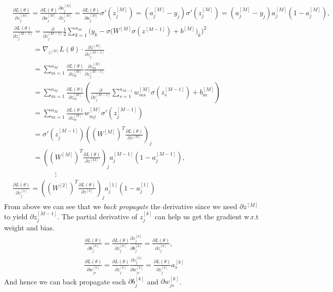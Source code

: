 \documentclass{article}
\begin{document}
            \begin{align*}
                & \frac{\partial L(\theta)}{\partial z_j^{[M]}} = \frac{\partial L(\theta)}{\partial a_j^{[M]}}\frac{\partial a_j^{[M]}}{\partial z_j^{[M]}}=\frac{\partial L(\theta)}{\partial a_j^{[M]}}\sigma'(z_j^{[M]})=(a_j^{[M]}-y_j)\sigma'(z_j^{[M]})=(a_j^{[M]}-y_j)a_j^{[M]}(1-a_j^{[M]}), \\
                & \frac{\partial L(\theta)}{\partial z_j^{[M-1]}} = \frac{\partial}{\partial z_j^{[M-1]}}\frac{1}{2}\sum_{k=1}^{n_M}\Big(y_k-\sigma\big(W^{[M]}\sigma(z^{[M-1]}) +b^{[M]}\big)_k\Big)^2 \\
                & \phantom{\frac{\partial L(\theta)}{\partial z_j^{[M-1]}}} =\nabla_{z^{[M]}}L(\theta)\cdot\frac{\partial z^{[M]}}{\partial z_j^{[M-1]}} \\
                & \phantom{\frac{\partial L(\theta)}{\partial z_j^{[M-1]}}} = \sum_{m=1}^{n_M} \frac{\partial L(\theta)}{\partial z_m^{[M]}}\frac{\partial z_m^{[M]}}{\partial z_j^{[M-1]}} \\
                & \phantom{\frac{\partial L(\theta)}{\partial z_j^{[M-1]}}} = \sum_{m=1}^{n_M} \frac{\partial L(\theta)}{\partial z_m^{[M]}}\left(\frac{\partial}{\partial z_j^{[M-1]}}\sum_{s=1}^{n_{M-1}}w_{ms}^{[M]}\sigma(z_s^{[M-1]})+b_m^{[M]}\right) \\
                & \phantom{\frac{\partial L(\theta)}{\partial z_j^{[M-1]}}} = \sum_{m=1}^{n_M} \frac{\partial L(\theta)}{\partial z_m^{[M]}}w_{mj}^{[M]}\sigma'(z_j^{[M-1]}) \\
                & \phantom{\frac{\partial L(\theta)}{\partial z_j^{[M-1]}}} = \sigma'(z_j^{[M-1]})\left((W^{[M]})^T\frac{\partial L(\theta)}{\partial z^{[M]}}\right)_j \\
                & \phantom{\frac{\partial L(\theta)}{\partial z_j^{[M-1]}}} = \left((W^{[M]})^T\frac{\partial L(\theta)}{\partial z^{[M]}}\right)_ja_j^{[M-1]}(1-a_j^{[M-1]}), \\
                & \qquad\qquad\qquad\vdots \\
                & \frac{\partial L(\theta)}{\partial z_j^{[1]}} = \left((W^{[2]})^T\frac{\partial L(\theta)}{\partial z^{[2]}}\right)_ja_j^{[1]}(1-a_j^{[1]})
            \end{align*}
            From above we can see that we \textit{back propagate} the derivative since we need $\partial z^{[M]}$ to yield $\partial z^{[M-1]}_j$. The partial derivative of $z_j^{[k]}$ can help us get the gradient w.r.t weight and bias.
            \begin{align*}
                & \frac{\partial L(\theta)}{\partial b_j^{[k]}}=\frac{\partial L(\theta)}{\partial z_j^{[k]}}\frac{\partial z_j^{[k]}}{\partial b_j^{[k]}}=\frac{\partial L(\theta)}{\partial z_j^{[k]}}, \\
                & \frac{\partial L(\theta)}{\partial w_{js}^{[k]}}=\frac{\partial L(\theta)}{\partial z_j^{[k]}}\frac{\partial z_j^{[k]}}{\partial w_{js}^{[k]}}=\frac{\partial L(\theta)}{\partial z_j^{[k]}}a_s^{[k]}
            \end{align*}
            And hence we can back propagate each $\partial b^{[k]}_j$ and $\partial w^{[k]}_{js}$.
\end{document}
